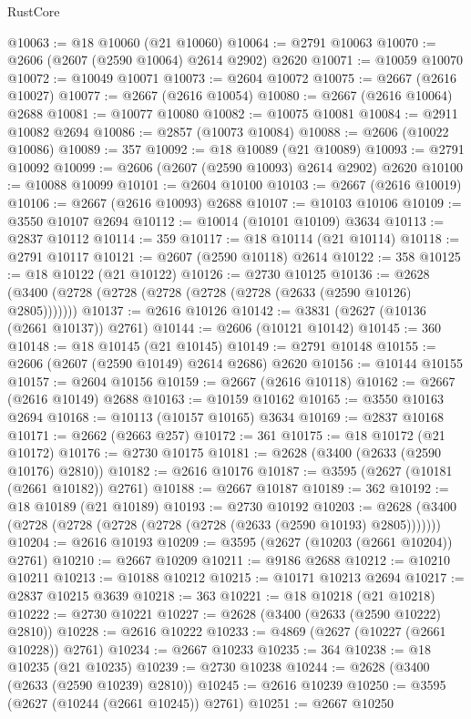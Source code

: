\begin{lexlean}{RustCore}
\begin{coremodule}
@10063 := @18 @10060 (@21 @10060)
@10064 := @2791 @10063
@10070 := @2606 (@2607 (@2590 @10064) @2614 @2902) @2620
@10071 := @10059 @10070
@10072 := @10049 @10071
@10073 := @2604 @10072
@10075 := @2667 (@2616 @10027)
@10077 := @2667 (@2616 @10054)
@10080 := @2667 (@2616 @10064) @2688
@10081 := @10077 @10080
@10082 := @10075 @10081
@10084 := @2911 @10082 @2694
@10086 := @2857 (@10073 @10084)
@10088 := @2606 (@10022 @10086)
@10089 := 357
@10092 := @18 @10089 (@21 @10089)
@10093 := @2791 @10092
@10099 := @2606 (@2607 (@2590 @10093) @2614 @2902) @2620
@10100 := @10088 @10099
@10101 := @2604 @10100
@10103 := @2667 (@2616 @10019)
@10106 := @2667 (@2616 @10093) @2688
@10107 := @10103 @10106
@10109 := @3550 @10107 @2694
@10112 := @10014 (@10101 @10109) @3634
@10113 := @2837 @10112
@10114 := 359
@10117 := @18 @10114 (@21 @10114)
@10118 := @2791 @10117
@10121 := @2607 (@2590 @10118) @2614
@10122 := 358
@10125 := @18 @10122 (@21 @10122)
@10126 := @2730 @10125
@10136 := @2628 (@3400 (@2728 (@2728 (@2728 (@2728 (@2728 (@2633 (@2590 @10126) @2805)))))))
@10137 := @2616 @10126
@10142 := @3831 (@2627 (@10136 (@2661 @10137)) @2761)
@10144 := @2606 (@10121 @10142)
@10145 := 360
@10148 := @18 @10145 (@21 @10145)
@10149 := @2791 @10148
@10155 := @2606 (@2607 (@2590 @10149) @2614 @2686) @2620
@10156 := @10144 @10155
@10157 := @2604 @10156
@10159 := @2667 (@2616 @10118)
@10162 := @2667 (@2616 @10149) @2688
@10163 := @10159 @10162
@10165 := @3550 @10163 @2694
@10168 := @10113 (@10157 @10165) @3634
@10169 := @2837 @10168
@10171 := @2662 (@2663 @257)
@10172 := 361
@10175 := @18 @10172 (@21 @10172)
@10176 := @2730 @10175
@10181 := @2628 (@3400 (@2633 (@2590 @10176) @2810))
@10182 := @2616 @10176
@10187 := @3595 (@2627 (@10181 (@2661 @10182)) @2761)
@10188 := @2667 @10187
@10189 := 362
@10192 := @18 @10189 (@21 @10189)
@10193 := @2730 @10192
@10203 := @2628 (@3400 (@2728 (@2728 (@2728 (@2728 (@2728 (@2633 (@2590 @10193) @2805)))))))
@10204 := @2616 @10193
@10209 := @3595 (@2627 (@10203 (@2661 @10204)) @2761)
@10210 := @2667 @10209
@10211 := @9186 @2688
@10212 := @10210 @10211
@10213 := @10188 @10212
@10215 := @10171 @10213 @2694
@10217 := @2837 @10215 @3639
@10218 := 363
@10221 := @18 @10218 (@21 @10218)
@10222 := @2730 @10221
@10227 := @2628 (@3400 (@2633 (@2590 @10222) @2810))
@10228 := @2616 @10222
@10233 := @4869 (@2627 (@10227 (@2661 @10228)) @2761)
@10234 := @2667 @10233
@10235 := 364
@10238 := @18 @10235 (@21 @10235)
@10239 := @2730 @10238
@10244 := @2628 (@3400 (@2633 (@2590 @10239) @2810))
@10245 := @2616 @10239
@10250 := @3595 (@2627 (@10244 (@2661 @10245)) @2761)
@10251 := @2667 @10250

\end{coremodule}
\end{lexlean}
